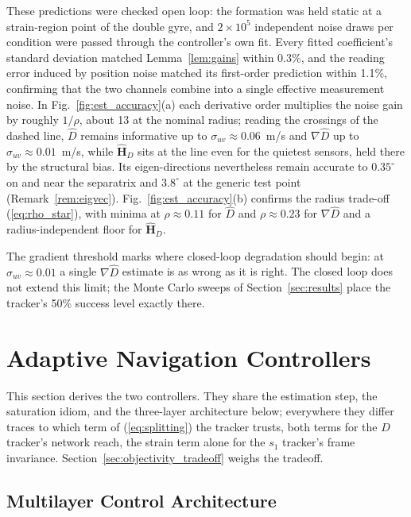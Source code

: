 \documentclass[lettersize,journal]{IEEEtran}
\begin{document}
These predictions were checked open loop: the formation was held static
at a strain-region point of the double gyre, and $2 \times 10^5$
independent noise draws per condition were passed through the
controller's own fit. Every fitted coefficient's standard deviation
matched Lemma~\ref{lem:gains} within 0.3\%, and the reading error
induced by position noise matched its first-order prediction within
1.1\%, confirming that the two channels combine into a single effective
measurement noise. In Fig.~\ref{fig:est_accuracy}(a) each derivative
order multiplies the noise gain by roughly $1/\rho$, about 13 at the
nominal radius; reading the crossings of the dashed line, $\hat{D}$
remains informative up to $\sigma_{uv} \approx 0.06$~m/s and
$\nabla\hat{D}$ up to $\sigma_{uv} \approx 0.01$~m/s, while
$\hat{\mathbf{H}}_D$ sits at the line even for the quietest sensors,
held there by the structural bias. Its eigen-directions nevertheless
remain accurate to $0.35^\circ$ on and near the separatrix and
$3.8^\circ$ at the generic test point (Remark~\ref{rem:eigvec}).
Fig.~\ref{fig:est_accuracy}(b) confirms the radius trade-off
(\ref{eq:rho_star}), with minima at $\rho \approx 0.11$ for $\hat{D}$
and $\rho \approx 0.23$ for $\nabla\hat{D}$ and a radius-independent
floor for $\hat{\mathbf{H}}_D$.

The gradient threshold marks where closed-loop degradation should
begin: at $\sigma_{uv} \approx 0.01$ a single $\nabla\hat{D}$ estimate
is as wrong as it is right. The closed loop does not extend this limit;
the Monte Carlo sweeps of Section~\ref{sec:results} place the tracker's
50\% success level exactly there.


\section{Adaptive Navigation Controllers}
\label{sec:controllers}

This section derives the two controllers. They share the estimation
step, the saturation idiom, and the three-layer architecture below;
everywhere they differ traces to which term of (\ref{eq:splitting}) the
tracker trusts, both terms for the $D$ tracker's network reach, the
strain term alone for the $s_1$ tracker's frame invariance.
Section~\ref{sec:objectivity_tradeoff} weighs the tradeoff.

\subsection{Multilayer Control Architecture}
\label{sec:arch}
\end{document}
